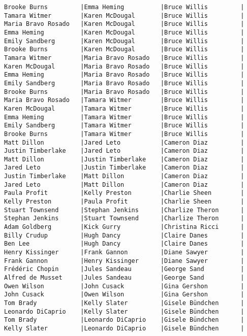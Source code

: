 \documentclass{article}
\begin{document}
\begin{verbatim}
Brooke Burns         |Emma Heming          |Bruce Willis         |
Tamara Witmer        |Karen McDougal       |Bruce Willis         |
Maria Bravo Rosado   |Karen McDougal       |Bruce Willis         |
Emma Heming          |Karen McDougal       |Bruce Willis         |
Emily Sandberg       |Karen McDougal       |Bruce Willis         |
Brooke Burns         |Karen McDougal       |Bruce Willis         |
Tamara Witmer        |Maria Bravo Rosado   |Bruce Willis         |
Karen McDougal       |Maria Bravo Rosado   |Bruce Willis         |
Emma Heming          |Maria Bravo Rosado   |Bruce Willis         |
Emily Sandberg       |Maria Bravo Rosado   |Bruce Willis         |
Brooke Burns         |Maria Bravo Rosado   |Bruce Willis         |
Maria Bravo Rosado   |Tamara Witmer        |Bruce Willis         |
Karen McDougal       |Tamara Witmer        |Bruce Willis         |
Emma Heming          |Tamara Witmer        |Bruce Willis         |
Emily Sandberg       |Tamara Witmer        |Bruce Willis         |
Brooke Burns         |Tamara Witmer        |Bruce Willis         |
Matt Dillon          |Jared Leto           |Cameron Diaz         |
Justin Timberlake    |Jared Leto           |Cameron Diaz         |
Matt Dillon          |Justin Timberlake    |Cameron Diaz         |
Jared Leto           |Justin Timberlake    |Cameron Diaz         |
Justin Timberlake    |Matt Dillon          |Cameron Diaz         |
Jared Leto           |Matt Dillon          |Cameron Diaz         |
Paula Profit         |Kelly Preston        |Charlie Sheen        |
Kelly Preston        |Paula Profit         |Charlie Sheen        |
Stuart Townsend      |Stephan Jenkins      |Charlize Theron      |
Stephan Jenkins      |Stuart Townsend      |Charlize Theron      |
Adam Goldberg        |Kick Gurry           |Christina Ricci      |
Billy Crudup         |Hugh Dancy           |Claire Danes         |
Ben Lee              |Hugh Dancy           |Claire Danes         |
Henry Kissinger      |Frank Gannon         |Diane Sawyer         |
Frank Gannon         |Henry Kissinger      |Diane Sawyer         |
Frédéric Chopin      |Jules Sandeau        |George Sand          |
Alfred de Musset     |Jules Sandeau        |George Sand          |
Owen Wilson          |John Cusack          |Gina Gershon         |
John Cusack          |Owen Wilson          |Gina Gershon         |
Tom Brady            |Kelly Slater         |Gisele Bündchen      |
Leonardo DiCaprio    |Kelly Slater         |Gisele Bündchen      |
Tom Brady            |Leonardo DiCaprio    |Gisele Bündchen      |
Kelly Slater         |Leonardo DiCaprio    |Gisele Bündchen      |

\end{verbatim}
\end{document}
